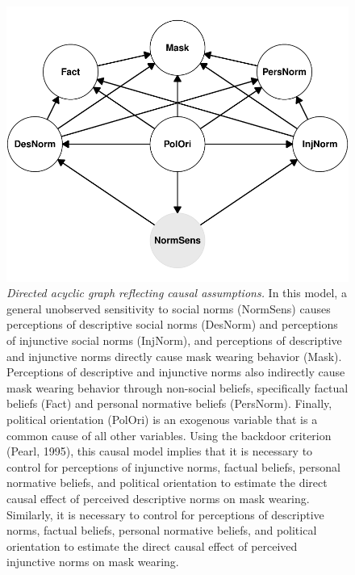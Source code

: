 \documentclass[
  man,floatsintext]{apa6}
\begin{document}
\begin{figure}
\centering
\includegraphics{manuscript_files/figure-latex/plotDAG-1.pdf}
\caption{\label{fig:plotDAG}\emph{Directed acyclic graph reflecting causal assumptions.} In this model, a general unobserved sensitivity to social norms (NormSens) causes perceptions of descriptive social norms (DesNorm) and perceptions of injunctive social norms (InjNorm), and perceptions of descriptive and injunctive norms directly cause mask wearing behavior (Mask). Perceptions of descriptive and injunctive norms also indirectly cause mask wearing behavior through non-social beliefs, specifically factual beliefs (Fact) and personal normative beliefs (PersNorm). Finally, political orientation (PolOri) is an exogenous variable that is a common cause of all other variables. Using the backdoor criterion (Pearl, 1995), this causal model implies that it is necessary to control for perceptions of injunctive norms, factual beliefs, personal normative beliefs, and political orientation to estimate the direct causal effect of perceived descriptive norms on mask wearing. Similarly, it is necessary to control for perceptions of descriptive norms, factual beliefs, personal normative beliefs, and political orientation to estimate the direct causal effect of perceived injunctive norms on mask wearing.}
\end{figure}

\newpage
\end{document}
